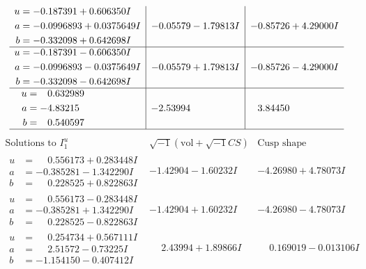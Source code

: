 \documentclass[1p]{elsarticle_modified}
\theoremstyle{definition}
\newcommand{\I}{\sqrt{-1}}
\begin{document}
$$\begin{array}{c|c|c}
\begin{aligned}
u &= -0.187391 + 0.606350 I \\
a &= -0.0996893 + 0.0375649 I \\
b &= -0.332098 + 0.642698 I\end{aligned}
 & -0.05579 - 1.79813 I & -0.85726 + 4.29000 I \\ \hline\begin{aligned}
u &= -0.187391 - 0.606350 I \\
a &= -0.0996893 - 0.0375649 I \\
b &= -0.332098 - 0.642698 I\end{aligned}
 & -0.05579 + 1.79813 I & -0.85726 - 4.29000 I \\ \hline\begin{aligned}
u &= \phantom{-}0.632989\phantom{ +0.000000I} \\
a &= -4.83215\phantom{ +0.000000I} \\
b &= \phantom{-}0.540597\phantom{ +0.000000I}\end{aligned}
 & -2.53994\phantom{ +0.000000I} & \phantom{-}3.84450\phantom{ +0.000000I}\\
 \hline 
 \end{array}$$\newpage$$\begin{array}{c|c|c}  
\text{Solutions to }I^u_{1}& \I (\text{vol} + \sqrt{-1}CS) & \text{Cusp shape}\\
 \hline 
\begin{aligned}
u &= \phantom{-}0.556173 + 0.283448 I \\
a &= -0.385281 - 1.342290 I \\
b &= \phantom{-}0.228525 + 0.822863 I\end{aligned}
 & -1.42904 - 1.60232 I & -4.26980 + 4.78073 I \\ \hline\begin{aligned}
u &= \phantom{-}0.556173 - 0.283448 I \\
a &= -0.385281 + 1.342290 I \\
b &= \phantom{-}0.228525 - 0.822863 I\end{aligned}
 & -1.42904 + 1.60232 I & -4.26980 - 4.78073 I \\ \hline\begin{aligned}
u &= \phantom{-}0.254734 + 0.567111 I \\
a &= \phantom{-}2.51572 - 0.73225 I \\
b &= -1.154150 - 0.407412 I\end{aligned}
 & \phantom{-}2.43994 + 1.89866 I & \phantom{-}0.169019 - 0.013106 I \\ \hline\begin{aligned}

\end{aligned}
\end{array}$$
\end{document}
